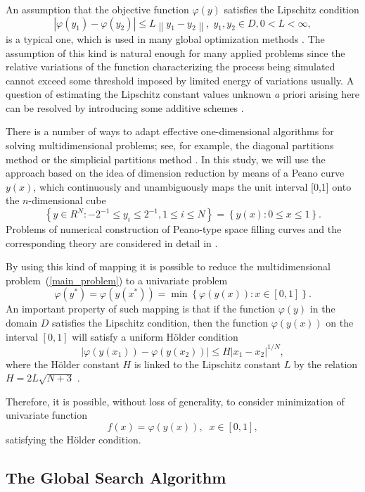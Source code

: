 \documentclass[sensors,article,submit,moreauthors,pdftex]{Definitions/mdpi}
\begin{document}
An assumption that the objective function $\varphi(y)$ satisfies the Lipschitz condition
\[
\left|\varphi(y_1)-\varphi(y_2)\right|\leq L\left\|y_1-y_2\right\|,\; y_1,y_2 \in D, 0<L<\infty,
\]
is a typical one, which is used in many global optimization methods \cite{Sergeyev2013,Evtushenko2013,Jones2009,Zilinskas2010}.
The assumption of this kind is natural enough for many applied problems since the relative variations of the function characterizing the process being simulated cannot exceed some threshold imposed by limited energy of variations usually. A question of estimating the Lipschitz constant values unknown {\textit a priori} arising here can be resolved by introducing some additive schemes \cite{Strongin2020,Strongin2020_1}.

There is a number of ways to adapt effective one-dimensional algorithms for solving multidimensional problems; see, for example, the diagonal partitions method \cite{Sergeyev2017} or the simplicial partitions method \cite{Zilinskas2014}. In this study, we will use the approach based on the idea of dimension reduction by means of a Peano curve $y(x)$, which continuously and unambiguously maps the unit interval [0,1] onto the $n$-dimensional cube
\[
\left\{y\in R^N: -2^{-1}\leq y_i \leq 2^{-1}, 1 \leq i \leq N\right\}=\left\{y(x):0\leq x \leq 1 \right\}.
\]
Problems of numerical construction of Peano-type space filling curves and the corresponding theory are considered in detail in \cite{Strongin2000,Sergeyev2013}.

By using this kind of mapping it is possible to reduce the multidimensional problem~(\ref{main_problem}) to a univariate problem
\[
\varphi(y^\ast)=\varphi(y(x^\ast))=\min{\left\{\varphi(y(x)): x\in[0,1]\right\}}.
\]
An important property of such mapping is that if the function $\varphi(y)$ in the domain $D$ satisfies the Lipschitz condition, then the function $\varphi(y(x))$ on the interval $[0,1]$ will satisfy a uniform H{\"o}lder condition
\[
\left|\varphi(y(x_1))-\varphi(y(x_2))\right|\leq H\left|x_1-x_2\right|^{1/N},
\]
where the H{\"o}lder constant $H$ is linked to the Lipschitz constant $L$ by the relation $H=2L\sqrt{N+3}$ \cite{Strongin2000}.

Therefore, it is possible, without loss of generality, to consider minimization of univariate function
\[
f(x)=\varphi(y(x)), \;\; x\in[0,1],
\]
satisfying the H{\"o}lder condition.


\subsection{The Global Search Algorithm}\label{GSA}
\end{document}

